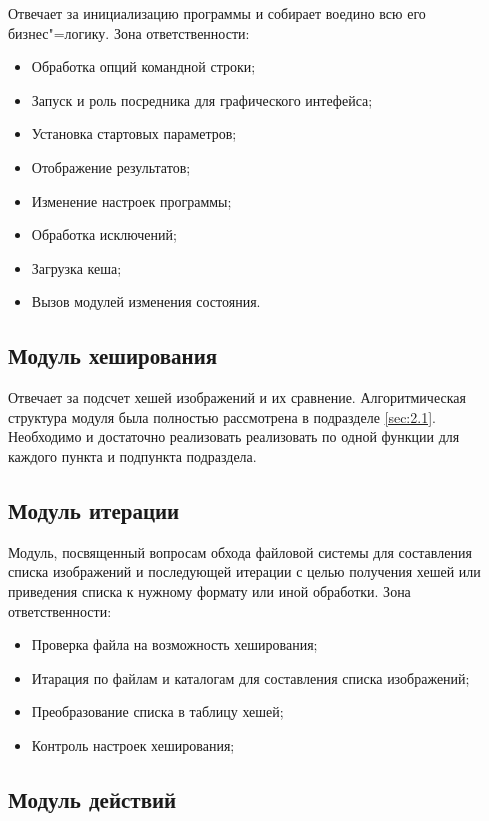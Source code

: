 Отвечает за инициализацию программы и собирает воедино всю его бизнес"=логику.
Зона ответственности:

\begin{itemize}
      \item Обработка опций командной строки;
      \item Запуск и роль посредника для графического интефейса;
      \item Установка стартовых параметров;
      \item Отображение результатов;
      \item Изменение настроек программы;
      \item Обработка исключений;
      \item Загрузка кеша;
      \item Вызов модулей изменения состояния.
\end{itemize}

\subsection*{Модуль хеширования}

Отвечает за подсчет хешей изображений и их сравнение. Алгоритмическая структура
модуля была полностью рассмотрена в подразделе \ref{sec:2.1}. Необходимо и
достаточно реализовать реализовать по одной функции для каждого пункта и
подпункта подраздела.

\subsection*{Модуль итерации}

Модуль, посвященный вопросам обхода файловой системы для составления
списка изображений и последующей итерации с целью получения хешей или приведения
списка к нужному формату или иной обработки. Зона ответственности:

\begin{itemize}
      \item Проверка файла на возможность хеширования;
      \item Итарация по файлам и каталогам для составления списка изображений;
      \item Преобразование списка в таблицу хешей;
      \item Контроль настроек хеширования;
\end{itemize}

\subsection*{Модуль действий}

